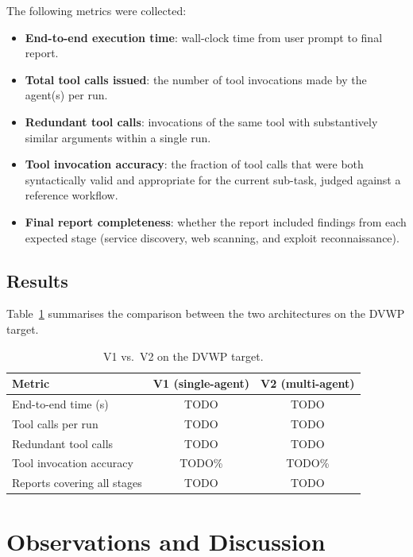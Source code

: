 \documentclass[sigconf,anonymous]{acmart}
\begin{document}
The following metrics were collected:

\begin{itemize}[leftmargin=*]
    \item \textbf{End-to-end execution time}: wall-clock time from user prompt to final report.
    \item \textbf{Total tool calls issued}: the number of tool invocations made by the agent(s) per run.
    \item \textbf{Redundant tool calls}: invocations of the same tool with substantively similar arguments within a single run.
    \item \textbf{Tool invocation accuracy}: the fraction of tool calls that were both syntactically valid and appropriate for the current sub-task, judged against a reference workflow.
    \item \textbf{Final report completeness}: whether the report included findings from each expected stage (service discovery, web scanning, and exploit reconnaissance).
\end{itemize}

\subsection{Results}

Table~\ref{tab:v1_vs_v2} summarises the comparison between the two architectures on the DVWP target.

\begin{table}[htbp]
\centering
\caption{V1 vs.\ V2 on the DVWP target.}
\label{tab:v1_vs_v2}
\small
\begin{tabular}{lcc}
\toprule
\textbf{Metric} & \textbf{V1 (single-agent)} & \textbf{V2 (multi-agent)} \\
\midrule
End-to-end time (s)         & TODO  & TODO \\
Tool calls per run          & TODO  & TODO \\
Redundant tool calls        & TODO  & TODO \\
Tool invocation accuracy    & TODO\% & TODO\% \\
Reports covering all stages & TODO  & TODO \\
\bottomrule
\end{tabular}
\end{table}

\section{Observations and Discussion}
\label{sec:discussion}
\end{document}
